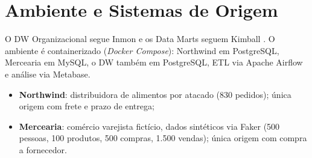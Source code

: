 \chapter{Ambiente e Sistemas de Origem}
\label{cap:fundamentacao}

O DW Organizacional segue Inmon \cite{inmon2005} e os Data Marts seguem Kimball \cite{kimball2013,kimball2004}. O ambiente é containerizado (\textit{Docker Compose}): Northwind em PostgreSQL, Mercearia em MySQL, o DW também em PostgreSQL, ETL via Apache Airflow e análise via Metabase.

\begin{itemize}
    \item \textbf{Northwind}: distribuidora de alimentos por atacado (830 pedidos); única origem com frete e prazo de entrega;
    \item \textbf{Mercearia}: comércio varejista fictício, dados sintéticos via Faker (500 pessoas, 100 produtos, 500 compras, 1.500 vendas); única origem com compra a fornecedor.
\end{itemize}
